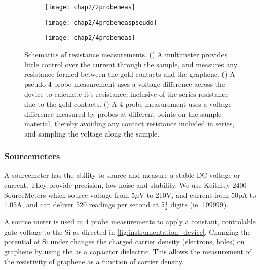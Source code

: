 \documentclass[../../Matt_Gebert_Honours_Thesis.tex]{subfiles}
\begin{document}
	
	\begin{figure}[H]
		\centering
		\begin{subfigure}[t]{0.25\textwidth}
			\centering
			\texttt{[image: chap2/2probemeas]}
			\caption{}\label{subfig:mutlimeter}
		\end{subfigure}\qquad
		\begin{subfigure}[t]{0.235\textwidth}
			\centering
			\texttt{[image: chap2/4probemeaspseudo]}
			\caption{}\label{subfig:4probepseudo}
		\end{subfigure}\qquad
		\begin{subfigure}[t]{0.25\textwidth}
			\centering
			\texttt{[image: chap2/4probemeas]}
			\caption{}\label{subfig:4probe}
		\end{subfigure}
		\caption[Schematics of resistance measurements]{Schematics of resistance measurements. () A multimeter provides little control over the current through the sample, and measures any resistance formed between the gold contacts and the graphene. () A pseudo 4 probe measurement uses a voltage difference across the device to calculate it's resistance, inclusive of the series resistance due to the gold contacts. () A 4 probe measurement uses a voltage difference measured by probes at different points on the sample material, thereby avoiding any contact resistance included in series, and sampling the voltage along the sample.}
		\label{fig:4probemeasurements}
	\end{figure}
	
	\subsubsection{Sourcemeters}
	
	A sourcemeter has the ability to source and measure a stable DC voltage or current. They provide precision, low noise and stability. We use Keithley 2400 SourceMeters \cite{keithley2400} which source voltage from $5\mu$V to 210V, and current from 50pA to 1.05A, and can deliver 520 readings per second at 5$\frac{1}{2}$ digits (ie, 199999).
	
	A source meter is used in 4 probe measurements to apply a constant, controlable gate voltage to the Si as directed in \cref{fig:instrumentation_device}. Changing the potential of Si under \silicondioxide{} changes the charged carrier density (electrons, holes) on graphene by using the \silicondioxide{} as a capacitor dielectric. This allows the measurement of the resistivity of graphene as a function of carrier density.
	
\end{document}
